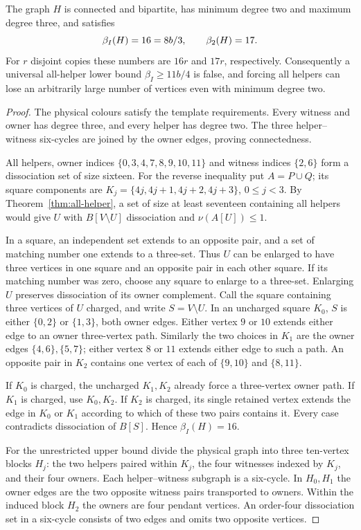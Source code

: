 \begin{theorem}\label{thm:sharp-all-helper}
The graph $H$ is connected and bipartite, has minimum degree two and maximum
degree three, and satisfies
\[
 \beta_I(H)=16=8b/3,\qquad \beta_2(H)=17.
\]
For $r$ disjoint copies these numbers are $16r$ and $17r$, respectively.
Consequently a universal all-helper lower bound $\beta_I\ge11b/4$ is false,
and forcing all helpers can lose an arbitrarily large number of vertices
even with minimum degree two.
\end{theorem}
\begin{proof}
The physical colours satisfy the template requirements. Every witness and
owner has degree three, and every helper has degree two. The three
helper--witness six-cycles are joined by the owner edges, proving connectedness.

All helpers, owner indices
$\{0,3,4,7,8,9,10,11\}$ and witness indices $\{2,6\}$ form a dissociation
set of size sixteen. For the reverse inequality put $A=P\cup Q$; its square
components are $K_j=\{4j,4j+1,4j+2,4j+3\}$, $0\le j<3$.
By Theorem~\ref{thm:all-helper}, a set of size at least seventeen containing
all helpers would give $U$ with $B[V\setminus U]$ dissociation and
$\nu(A[U])\le1$.

In a square, an independent set extends to an opposite pair, and a set
of matching number one extends to a three-set. Thus $U$ can be enlarged to
have three vertices in one square and an opposite pair in each other square.
If its matching number was zero, choose any square to enlarge to a three-set.
Enlarging $U$ preserves dissociation of its owner complement. Call the square
containing three vertices of $U$ charged, and write $S=V\setminus U$.
In an uncharged square $K_0$, $S$ is either $\{0,2\}$
or $\{1,3\}$, both owner edges. Either vertex $9$ or $10$ extends either
edge to an owner three-vertex path. Similarly the two choices in $K_1$ are
the owner edges $\{4,6\},\{5,7\}$; either vertex $8$ or $11$ extends either
edge to such a path. An opposite pair in $K_2$ contains one vertex of each
of $\{9,10\}$ and $\{8,11\}$.

If $K_0$ is charged, the uncharged $K_1,K_2$ already force a three-vertex
owner path. If $K_1$ is charged, use $K_0,K_2$. If $K_2$ is charged, its
single retained vertex extends the edge in $K_0$ or $K_1$ according to which
of these two pairs contains it. Every case contradicts dissociation of
$B[S]$. Hence $\beta_I(H)=16$.

For the unrestricted upper bound divide the physical graph into three
ten-vertex blocks $H_j$: the two helpers paired within $K_j$, the four
witnesses indexed by $K_j$, and their four owners. Each helper--witness
subgraph is a six-cycle. In $H_0,H_1$ the owner edges are the two opposite
witness pairs transported to owners. Within the induced block $H_2$ the
owners are four pendant vertices. An order-four dissociation set in a six-cycle
consists of two
edges and omits two opposite vertices.


\end{proof}
